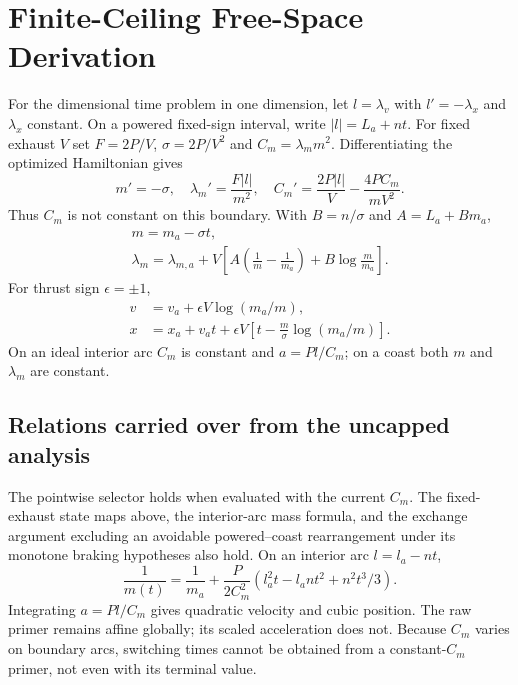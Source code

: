 \documentclass[journal,a4paper]{IEEEtran}
\begin{document}
\section{Finite-Ceiling Free-Space Derivation}
\label{sec:appendix_capped_derivation}
For the dimensional time problem in one dimension, let
$l=\lambda_v$ with $l'=-\lambda_x$ and $\lambda_x$ constant.
On a powered fixed-sign interval, write $|l|=L_a+nt$.
For fixed exhaust $V$ set $F=2P/V$, $\sigma=2P/V^2$ and
$C_m=\lambda_m m^2$. Differentiating the optimized Hamiltonian gives
\begin{equation}
 m'=-\sigma,\quad
 \lambda_m'=\frac{F|l|}{m^2},\quad
 C_m'=\frac{2P|l|}{V}-\frac{4PC_m}{mV^2}.
\end{equation}
Thus $C_m$ is not constant on this boundary. With
$B=n/\sigma$ and $A=L_a+Bm_a$,
\begin{equation}
 \begin{gathered}
 m=m_a-\sigma t,\\
 \lambda_m=\lambda_{m,a}
 +V\left[A\left(\frac1m-\frac1{m_a}\right)
                  +B\log\frac m{m_a}\right].
 \end{gathered}
\end{equation}
For thrust sign $\epsilon=\pm1$,
\begin{equation}
 \begin{split}
 v&=v_a+\epsilon V\log(m_a/m),\\
 x&=x_a+v_at+\epsilon V
                \left[t-\frac m\sigma\log(m_a/m)\right].
 \end{split}
\end{equation}
On an ideal interior arc $C_m$ is constant and $a=Pl/C_m$;
on a coast both $m$ and $\lambda_m$ are constant.

\subsection{Relations carried over from the uncapped analysis}
The pointwise selector holds when evaluated with the current $C_m$.
The fixed-exhaust state maps above, the interior-arc mass formula, and
the exchange argument excluding an avoidable powered--coast rearrangement
under its monotone braking hypotheses also hold. On an interior arc
$l=l_a-nt$,
\begin{equation}
 \frac1{m(t)}=\frac1{m_a}+\frac{P}{2C_m^2}
       (l_a^2t-l_an t^2+n^2t^3/3).
\end{equation}
Integrating $a=Pl/C_m$ gives quadratic velocity and cubic position.
The raw primer remains affine globally; its scaled acceleration does not.
Because $C_m$ varies on boundary arcs, switching times cannot be
obtained from a constant-$C_m$ primer, not even with its terminal value.
\end{document}
